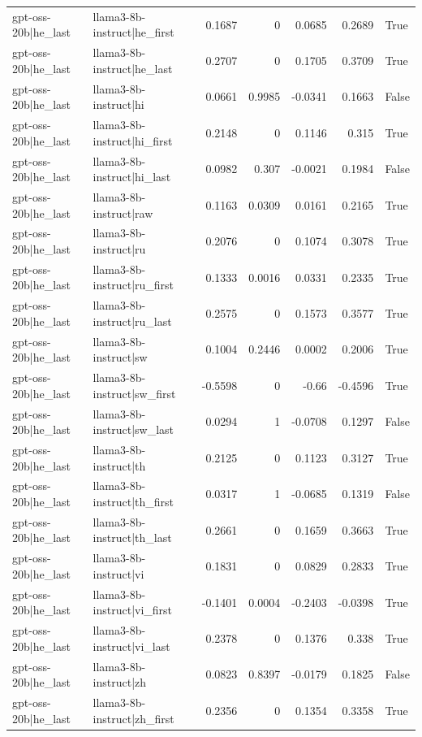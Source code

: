 \begin{table}
\begin{tabular}{l l r r r r l}
gpt-oss-20b|he_last & llama3-8b-instruct|he_first & 0.1687 & 0 & 0.0685 & 0.2689 & True \\
gpt-oss-20b|he_last & llama3-8b-instruct|he_last & 0.2707 & 0 & 0.1705 & 0.3709 & True \\
gpt-oss-20b|he_last & llama3-8b-instruct|hi & 0.0661 & 0.9985 & -0.0341 & 0.1663 & False \\
gpt-oss-20b|he_last & llama3-8b-instruct|hi_first & 0.2148 & 0 & 0.1146 & 0.315 & True \\
gpt-oss-20b|he_last & llama3-8b-instruct|hi_last & 0.0982 & 0.307 & -0.0021 & 0.1984 & False \\
gpt-oss-20b|he_last & llama3-8b-instruct|raw & 0.1163 & 0.0309 & 0.0161 & 0.2165 & True \\
gpt-oss-20b|he_last & llama3-8b-instruct|ru & 0.2076 & 0 & 0.1074 & 0.3078 & True \\
gpt-oss-20b|he_last & llama3-8b-instruct|ru_first & 0.1333 & 0.0016 & 0.0331 & 0.2335 & True \\
gpt-oss-20b|he_last & llama3-8b-instruct|ru_last & 0.2575 & 0 & 0.1573 & 0.3577 & True \\
gpt-oss-20b|he_last & llama3-8b-instruct|sw & 0.1004 & 0.2446 & 0.0002 & 0.2006 & True \\
gpt-oss-20b|he_last & llama3-8b-instruct|sw_first & -0.5598 & 0 & -0.66 & -0.4596 & True \\
gpt-oss-20b|he_last & llama3-8b-instruct|sw_last & 0.0294 & 1 & -0.0708 & 0.1297 & False \\
gpt-oss-20b|he_last & llama3-8b-instruct|th & 0.2125 & 0 & 0.1123 & 0.3127 & True \\
gpt-oss-20b|he_last & llama3-8b-instruct|th_first & 0.0317 & 1 & -0.0685 & 0.1319 & False \\
gpt-oss-20b|he_last & llama3-8b-instruct|th_last & 0.2661 & 0 & 0.1659 & 0.3663 & True \\
gpt-oss-20b|he_last & llama3-8b-instruct|vi & 0.1831 & 0 & 0.0829 & 0.2833 & True \\
gpt-oss-20b|he_last & llama3-8b-instruct|vi_first & -0.1401 & 0.0004 & -0.2403 & -0.0398 & True \\
gpt-oss-20b|he_last & llama3-8b-instruct|vi_last & 0.2378 & 0 & 0.1376 & 0.338 & True \\
gpt-oss-20b|he_last & llama3-8b-instruct|zh & 0.0823 & 0.8397 & -0.0179 & 0.1825 & False \\
gpt-oss-20b|he_last & llama3-8b-instruct|zh_first & 0.2356 & 0 & 0.1354 & 0.3358 & True \\

\end{tabular}
\end{table}
